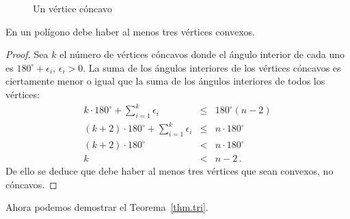 \begin{figure}[t]
\begin{center}
\end{center}
\caption{Un vértice cóncavo}\label{f.museum.concave}
\end{figure}

\begin{theorem}\label{thm.convex}
En un polígono debe haber al menos tres vértices convexos.
\end{theorem}

\begin{proof}
Sea $k$ el número de vértices cóncavos donde el ángulo interior de cada uno es $180^\circ+\epsilon_i$, $\epsilon_i>0$. La suma de los ángulos interiores de los vértices cóncavos es ciertamente menor o igual que la suma de los ángulos interiores de todos los vértices:
\begin{eqnarray*}
k\cdot 180^\circ +\displaystyle\sum_{i=1}^{k}\epsilon_i &\leq& 180^\circ(n-2)\\
(k+2)\cdot 180^\circ +\displaystyle\sum_{i=1}^{k}\epsilon_i &\leq& n\cdot 180^\circ\\
(k+2)\cdot 180^\circ &<& n\cdot 180^\circ\\
k&<&n-2\,.
\end{eqnarray*}
De ello se deduce que debe haber al menos tres vértices que sean convexos, no cóncavos.
\end{proof}

\noindent{}Ahora podemos demostrar el Teorema~\ref{thm.tri}.

